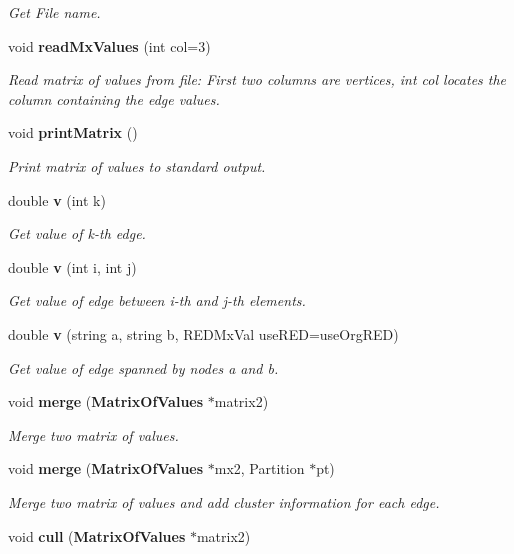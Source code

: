 \begin{CompactItemize}
\begin{CompactList}\small\item\em Get File name. \item\end{CompactList}\item 
void {\bf read\-Mx\-Values} (int col=3)
\begin{CompactList}\small\item\em Read matrix of values from file: First two columns are vertices, int col locates the column containing the edge values. \item\end{CompactList}\item 
void {\bf print\-Matrix} ()\label{classMatrixOfValues_a14}

\begin{CompactList}\small\item\em Print matrix of values to standard output. \item\end{CompactList}\item 
double {\bf v} (int k)\label{classMatrixOfValues_a15}

\begin{CompactList}\small\item\em Get value of k-th edge. \item\end{CompactList}\item 
double {\bf v} (int i, int j)\label{classMatrixOfValues_a16}

\begin{CompactList}\small\item\em Get value of edge between i-th and j-th elements. \item\end{CompactList}\item 
double {\bf v} (string a, string b, REDMx\-Val use\-RED=use\-Org\-RED)
\begin{CompactList}\small\item\em Get value of edge spanned by nodes a and b. \item\end{CompactList}\item 
void {\bf merge} ({\bf Matrix\-Of\-Values} $\ast$matrix2)\label{classMatrixOfValues_a18}

\begin{CompactList}\small\item\em Merge two matrix of values. \item\end{CompactList}\item 
void {\bf merge} ({\bf Matrix\-Of\-Values} $\ast$mx2, Partition $\ast$pt)
\begin{CompactList}\small\item\em Merge two matrix of values and add cluster information for each edge. \item\end{CompactList}\item 
void {\bf cull} ({\bf Matrix\-Of\-Values} $\ast$matrix2)\label{classMatrixOfValues_a20}


\end{CompactItemize}
